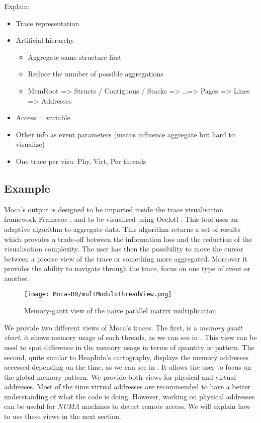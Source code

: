 Explain:
\begin{itemize}
    \item Trace representation
    \item Artificial hierarchy
        \begin{itemize}
            \item Aggregate same structure first
            \item Reduce the number of possible aggregations
            \item MemRoot => Structs / Contiguous / Stacks => \ldots => Pages => Lines => Addresses
        \end{itemize}
    \item Access = variable
    \item Other info as event parameters (means influence aggregate but hard to visualize)
    \item One trace per visu: Phy, Virt, Per threads
\end{itemize}

\subsection{Example}


\gls{Moca}'s output is designed to be imported inside the trace visualisation framework \gls{Framesoc} \cite{Pagano13Trace}, and to be visualised using \gls{Ocelotl} \cite{Dosimont14Trace}.
This tool uses an adaptive algorithm to aggregate data.
This algorithm returns a set of results which provides a trade-off between the information loss and the reduction of the visualisation complexity.
The user has then the possibility to move the cursor between a precise view of the trace or something more aggregated.
Moreover it provides the ability to navigate through the trace, focus on one type of event or another.

\begin{figure}[htb]
    \centering
    \texttt{[image: Moca-RR/multModuloThreadView.png]}
    \caption{Memory-gantt view of the naïve parallel matrix multiplication.}
    \label{fig:ocelotl-th0}
\end{figure}


We provide two different views of \gls{Moca}'s traces.
The first, is a \emph{memory gantt chart}, it shows memory usage of each threads, as we can see in .
This view can be used to spot difference in the memory usage in terms of quantity or pattern.
The second, quite similar to HeapInfo's cartography, displays the memory addresses accessed depending on the time, as we can see in .
It allows the user to focus on the global memory pattern.
We provide both views for physical and virtual addresses.
Most of the time virtual addresses are recommended to have a better understanding of what the code is doing.
However, working on physical addresses can be useful for \emph{NUMA} machines to detect remote access.
We will explain how to use these views in the next section.

